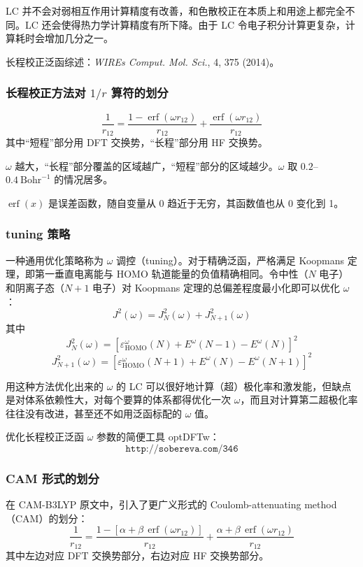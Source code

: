 LC 并不会对弱相互作用计算精度有改善，和色散校正在本质上和用途上都完全不同。LC 还会使得热力学计算精度有所下降。由于 LC 令电子积分计算更复杂，计算耗时会增加几分之一。

长程校正泛函综述：\textit{WIREs Comput. Mol. Sci.}, 4, 375 (2014)。

\subsubsection*{长程校正方法对 $1/r$ 算符的划分}

\[
\frac{1}{r_{12}}
=
\frac{1-\operatorname{erf}(\omega r_{12})}{r_{12}}
+
\frac{\operatorname{erf}(\omega r_{12})}{r_{12}}
\]
其中“短程”部分用 DFT 交换势，“长程”部分用 HF 交换势。

$\omega$ 越大，“长程”部分覆盖的区域越广，“短程”部分的区域越少。$\omega$ 取 $0.2$--$0.4\ \mathrm{Bohr}^{-1}$ 的情况居多。

$\operatorname{erf}(x)$ 是误差函数，随自变量从 0 趋近于无穷，其函数值也从 0 变化到 1。

\subsubsection*{tuning 策略}

一种通用优化策略称为 $\omega$ 调控（tuning）。对于精确泛函，严格满足 Koopmans 定理，即第一垂直电离能与 HOMO 轨道能量的负值精确相同。令中性（$N$ 电子）和阴离子态（$N+1$ 电子）对 Koopmans 定理的总偏差程度最小化即可以优化 $\omega$：
\[
J^2(\omega)=J_N^2(\omega)+J_{N+1}^2(\omega)
\]
其中
\[
J_N^2(\omega)
=
\left[\varepsilon_{\mathrm{HOMO}}^\omega(N)
+E^\omega(N-1)-E^\omega(N)\right]^2
\]
\[
J_{N+1}^2(\omega)
=
\left[\varepsilon_{\mathrm{HOMO}}^\omega(N+1)
+E^\omega(N)-E^\omega(N+1)\right]^2
\]

用这种方法优化出来的 $\omega$ 的 LC 可以很好地计算（超）极化率和激发能，但缺点是对体系依赖性大，对每个要算的体系都得优化一次 $\omega$，而且对计算第二超极化率往往没有改进，甚至还不如用泛函标配的 $\omega$ 值。

优化长程校正泛函 $\omega$ 参数的简便工具 optDFTw：
\[
\texttt{http://sobereva.com/346}
\]

\subsubsection*{CAM 形式的划分}

在 CAM-B3LYP 原文中，引入了更广义形式的 Coulomb-attenuating method（CAM）的划分：
\[
\frac{1}{r_{12}}
=
\frac{1-[\alpha+\beta\,\operatorname{erf}(\omega r_{12})]}{r_{12}}
+
\frac{\alpha+\beta\,\operatorname{erf}(\omega r_{12})}{r_{12}}
\]
其中左边对应 DFT 交换势部分，右边对应 HF 交换势部分。

